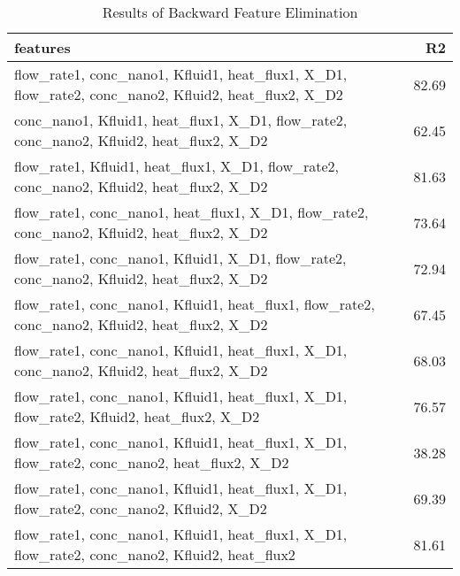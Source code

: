 
    \begin{table*}[h]
        \centering
        \begin{tabular}{lr}
\hline
 features                                                                                                     &    R2 \\
\hline
 flow\_rate1, conc\_nano1, Kfluid1, heat\_flux1, X\_D1, flow\_rate2, conc\_nano2, Kfluid2, heat\_flux2, X\_D2 & 82.69 \\
 conc\_nano1, Kfluid1, heat\_flux1, X\_D1, flow\_rate2, conc\_nano2, Kfluid2, heat\_flux2, X\_D2              & 62.45 \\
 flow\_rate1, Kfluid1, heat\_flux1, X\_D1, flow\_rate2, conc\_nano2, Kfluid2, heat\_flux2, X\_D2              & 81.63 \\
 flow\_rate1, conc\_nano1, heat\_flux1, X\_D1, flow\_rate2, conc\_nano2, Kfluid2, heat\_flux2, X\_D2          & 73.64 \\
 flow\_rate1, conc\_nano1, Kfluid1, X\_D1, flow\_rate2, conc\_nano2, Kfluid2, heat\_flux2, X\_D2              & 72.94 \\
 flow\_rate1, conc\_nano1, Kfluid1, heat\_flux1, flow\_rate2, conc\_nano2, Kfluid2, heat\_flux2, X\_D2        & 67.45 \\
 flow\_rate1, conc\_nano1, Kfluid1, heat\_flux1, X\_D1, conc\_nano2, Kfluid2, heat\_flux2, X\_D2              & 68.03 \\
 flow\_rate1, conc\_nano1, Kfluid1, heat\_flux1, X\_D1, flow\_rate2, Kfluid2, heat\_flux2, X\_D2              & 76.57 \\
 flow\_rate1, conc\_nano1, Kfluid1, heat\_flux1, X\_D1, flow\_rate2, conc\_nano2, heat\_flux2, X\_D2          & 38.28 \\
 flow\_rate1, conc\_nano1, Kfluid1, heat\_flux1, X\_D1, flow\_rate2, conc\_nano2, Kfluid2, X\_D2              & 69.39 \\
 flow\_rate1, conc\_nano1, Kfluid1, heat\_flux1, X\_D1, flow\_rate2, conc\_nano2, Kfluid2, heat\_flux2        & 81.61 \\
\hline
\end{tabular}
        \caption{Results of Backward Feature Elimination}
        \label{backward}
    \end{table*}
    
